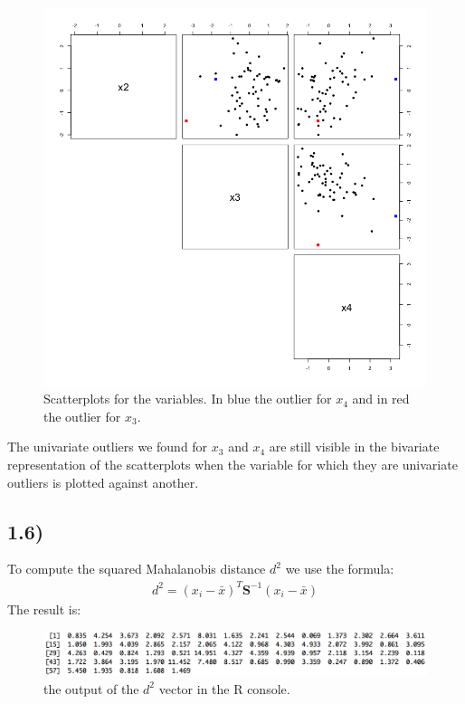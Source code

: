 \documentclass[a4paper,11pt,oneside]{report}
\begin{document}
	\begin{figure}[H]
	\centering
	\includegraphics[scale = 0.5]{pairs_scatterplot1_ex1.png}
	\caption{Scatterplots for the variables. In blue the outlier for $x_4$ and in red the outlier for $x_3$.}
	\end{figure}
	The univariate outliers we found for $x_3$ and $x_4$ are still visible in the bivariate representation of the scatterplots when the variable for which they are univariate outliers is plotted against another.

\subsection*{1.6)}
	To compute the squared Mahalanobis distance $d^2$ we use the formula:
	\begin{align}
	d^2 = (x_i - \bar x)^T \mathbf{S}^{-1} (x_i - \bar x)
	\end{align}
	The result is:
	\begin{figure}[H]
	\centering
	\includegraphics[scale = 0.55]{d.png}
	\caption{the output of the $d^2$ vector in the R console.}
	\end{figure}
\end{document}
